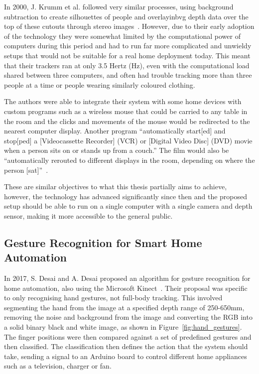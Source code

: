 In 2000, J. Krumm et al. followed very similar processes, using background subtraction to create silhouettes of people and overlayinbvg depth data over the top of these cutouts through stereo images~\cite{Krum00}.
However, due to their early adoption of the technology they were somewhat limited by the computational power of computers during this period and had to run far more complicated and unwieldy setups that would not be suitable for a real home deployment today.
This meant that their trackers ran at only 3.5 Hertz (Hz), even with the computational load shared between three computers, and often had trouble tracking more than three people at a time or people wearing similarly coloured clothing.

The authors were able to integrate their system with some home devices with custom programs such as a wireless mouse that could be carried to any table in the room and the clicks and movements of the mouse would be redirected to the nearest computer display.
Another program ``automatically start[ed] and stop[ped] a [Videocassette Recorder] (VCR) or [Digital Video Disc] (DVD) movie when a person sits on or stands up from a couch.''
The film would also be ``automatically rerouted to different displays in the room, depending on where the person [sat]''~\cite{Krum00}.

These are similar objectives to what this thesis partially aims to achieve, however, the technology has advanced significantly since then and the proposed setup should be able to run on a single computer with a single camera and depth sensor, making it more accessible to the general public.

\subsection{Gesture Recognition for Smart Home Automation}
In 2017, S. Desai and A. Desai proposed an algorithm for gesture recognition for home automation, also using the Microsoft Kinect~\cite{Desa17}.
Their proposal was specific to only recognising hand gestures, not full-body tracking.
This involved segmenting the hand from the image at a specified depth range of 250-650mm, removing the noise and background from the image and converting the RGB into a solid binary black and white image, as shown in Figure~\ref{fig:hand_gestures}.
The finger positions were then compared against a set of predefined gestures and then classified.
The classification then defines the action that the system should take, sending a signal to an Arduino board to control different home appliances such as a television, charger or fan.

